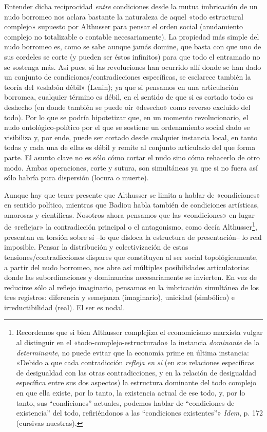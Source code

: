 Entender dicha reciprocidad \emph{entre} condiciones desde la mutua imbricación de un nudo borromeo nos aclara bastante la naturaleza de aquel «todo estructural complejo» supuesto por Althusser para pensar el orden social (anudamiento complejo no totalizable o contable necesariamente). La propiedad más simple del nudo borromeo es, como se sabe aunque jamás domine, que basta con que uno de sus cordeles se corte (y pueden ser éstos infinitos) para que todo el entramado no se sostenga más. Así pues, si las revoluciones han ocurrido allí donde se han dado un conjunto de condiciones/contradicciones específicas, se esclarece también la teoría del «eslabón débil» (Lenin); ya que si pensamos en una articulación borromea, cualquier término es débil, en el sentido de que si es cortado todo es deshecho (en donde también se puede oír «desecho» como reverso excluido del todo). Por lo que se podría hipotetizar que, en un momento revolucionario, el nudo ontológico-político por el que se sostiene un ordenamiento social dado se visibiliza y, por ende, puede ser cortado desde cualquier instancia local, en tanto todas y cada una de ellas es débil y remite al conjunto articulado del que forma parte. El asunto clave no es sólo cómo cortar el nudo sino cómo rehacerlo de otro modo. Ambas operaciones, corte y sutura, son simultáneas ya que si no fuera así sólo habría pura dispersión (locura o muerte).

Aunque hay que tener presente que Althusser se limita a hablar de «condiciones» en sentido político, mientras que Badiou habla también de condiciones artísticas, amorosas y científicas. Nosotros ahora pensamos que las «condiciones» en lugar de «reflejar» la contradicción principal o el antagonismo, como decía Althusser\footnote{Recordemos que si bien Althusser complejiza el economicismo marxista vulgar al distinguir en el «todo-complejo-estructurado» la instancia \emph{dominante} de la \emph{determinante}, no puede evitar que la economía prime en última instancia: «Debido a que cada contradicción \emph{refleja en sí} (en sus relaciones específicas de desigualdad con las otras contradicciones, y en la relación de desigualdad específica entre sus dos aspectos) la estructura dominante del todo complejo en que ella existe, por lo tanto, la existencia actual de ese todo, y, por lo tanto, sus ``condiciones'' actuales, podemos hablar de ``condiciones de existencia'' del todo, refiriéndonos a las ``condiciones existentes''» \emph{Idem}, p. 172 (cursivas nuestras).}, presentan en torsión sobre sí --lo que disloca la estructura de presentación-- lo real imposible. Pensar la distribución y colectivización de estas tensiones/contradicciones dispares que constituyen al ser social topológicamente, a partir del nudo borromeo, nos abre así múltiples posibilidades articulatorias donde las subordinaciones y dominancias necesariamente se invierten. En vez de reducirse sólo al reflejo imaginario, pensamos en la imbricación simultánea de los tres registros: diferencia y semejanza (imaginario), unicidad (simbólico) e irreductibilidad (real). El ser es nodal.

